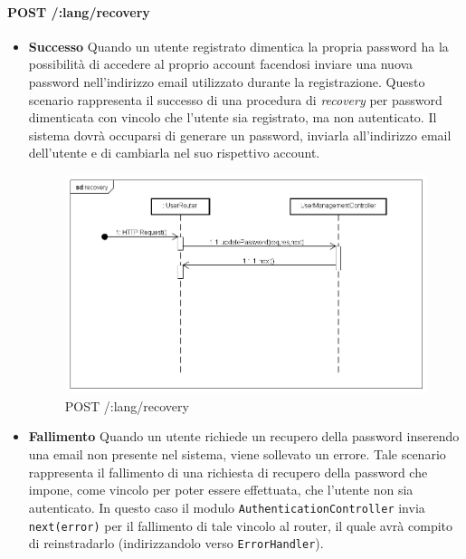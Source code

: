 \paragraph{POST /:lang/recovery}
\begin{itemize}
\item \textbf{Successo}
Quando un utente registrato dimentica la propria password ha la possibilità di accedere al proprio account facendosi inviare una nuova password nell'indirizzo email utilizzato durante la registrazione. Questo scenario rappresenta il successo di una procedura di \textit{recovery} per password dimenticata con vincolo che l'utente sia registrato, ma non autenticato. Il sistema dovrà occuparsi di generare un password, inviarla all'indirizzo email dell'utente e di cambiarla nel suo rispettivo account.

\label{Procedura di recupero password}
\begin{figure}[ht]
	\centering
	\includegraphics[scale=0.40]{UML/DiagrammiDiSequenza/Back-end/POST__lang_recovery_success.png}
	\caption{POST /:lang/recovery}
\end{figure}
\FloatBarrier

\item \textbf{Fallimento}
Quando un utente richiede un recupero della password inserendo una email non presente nel sistema, viene sollevato un errore. Tale scenario rappresenta il fallimento di una richiesta di recupero della password che impone, come vincolo per poter essere effettuata, che l'utente non sia autenticato. In questo caso il modulo \texttt{AuthenticationController} invia \texttt{next(error)} per il fallimento di tale vincolo al router, il quale avrà compito di reinstradarlo (indirizzandolo verso \texttt{ErrorHandler}).


\end{itemize}
